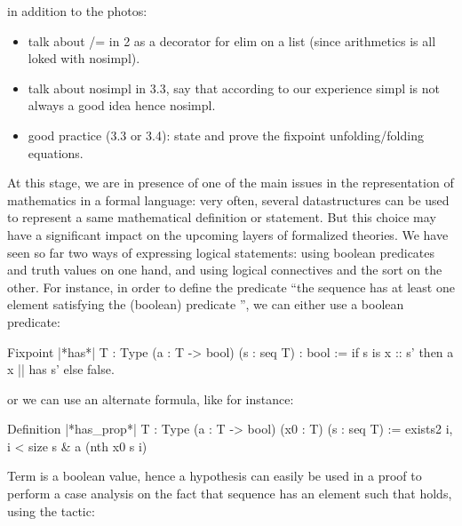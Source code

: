 
in addition to the photos:
\begin{itemize}
\item talk about /= in 2 as a decorator for elim on a list (since arithmetics is all loked with nosimpl).
\item talk about nosimpl in 3.3, say that according to our experience simpl is not
always a good idea hence nosimpl.
\item good practice (3.3 or 3.4): state and prove the fixpoint unfolding/folding
equations.
\end{itemize}




At this stage, we are in presence of one of the main issues in the
representation of mathematics in a formal language: very often,
several datastructures can be used to represent a same mathematical
definition or statement. But this choice may have a significant impact
on the upcoming layers of formalized theories. We have seen so far two
ways of expressing logical statements: using boolean predicates and
truth values on one hand, and using logical connectives and the
 sort on the other. For instance, in order to define the
predicate ``the sequence  has at least one element satisfying the
(boolean) predicate '', we can either use a boolean predicate:

\begin{coq}{}{}
Fixpoint |*has*| {T : Type} (a : T -> bool) (s : seq T) : bool :=
  if s is x :: s' then a x || has s' else false.
\end{coq}

or we can use an alternate formula, like for instance:

\begin{coq}{}{}
Definition |*has_prop*|  {T : Type} (a : T -> bool) (x0 : T) (s : seq T) :=
   exists2 i, i < size s & a (nth x0 s i)
\end{coq}

Term  is a boolean value, hence a hypothesis
 can easily be used in a proof to perform a case
analysis on the fact that sequence
 has an element such that  holds, using the  tactic:

